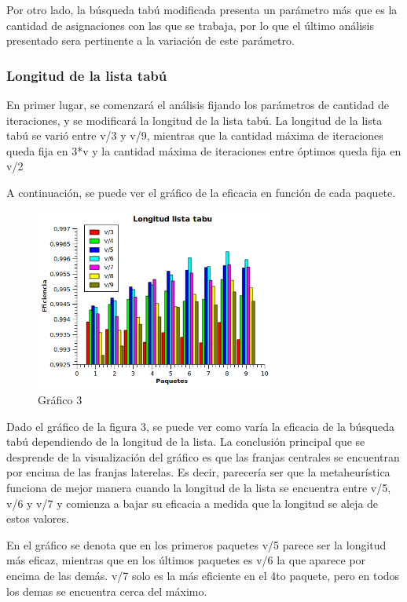 \documentclass[a4paper,10pt]{article}
\begin{document}
Por otro lado, la b\'usqueda tab\'u modificada presenta un par\'ametro m\'as que es la cantidad de asignaciones con las que se trabaja, por lo que el \'ultimo an\'alisis presentado sera pertinente a la variaci\'on de este par\'ametro.

\bigskip

\subsubsection*{Longitud de la lista tab\'u}

En primer lugar, se comenzar\'a el an\'alisis fijando los par\'ametros de cantidad de iteraciones, y se modificar\'a la longitud de la lista tab\'u. La longitud de la lista tab\'u se vari\'o entre v/3 y v/9, mientras que la cantidad m\'axima de iteraciones queda fija en 3*v y la cantidad m\'axima de iteraciones entre \'optimos queda fija en v/2

A continuaci\'on, se puede ver el gr\'afico de la eficacia en funci\'on de cada paquete. 


\begin{figure}[H]
\centering
\includegraphics[width=0.7\textwidth]{graficos/combo3.png} 
\caption{Gráfico 3}
\end{figure}

Dado el gr\'afico de la figura 3, se puede ver como var\'ia la eficacia de la b\'usqueda tab\'u dependiendo de la longitud de la lista. La conclusi\'on principal que se desprende de la visualizaci\'on del gr\'afico es que las franjas centrales se encuentran por encima de las franjas laterelas. Es decir, parecer\'ia ser que la metaheur\'istica funciona de mejor manera cuando la longitud de la lista se encuentra entre v/5, v/6 y v/7 y comienza a bajar su eficacia a medida que la longitud se aleja de estos valores.

En el gr\'afico se denota que en los primeros paquetes v/5 parece ser la longitud m\'as eficaz, mientras que en los \'ultimos paquetes es v/6 la que aparece por encima de las dem\'as. v/7 solo es la m\'as eficiente en el 4to paquete, pero en todos los demas se encuentra cerca del m\'aximo.
\end{document}
